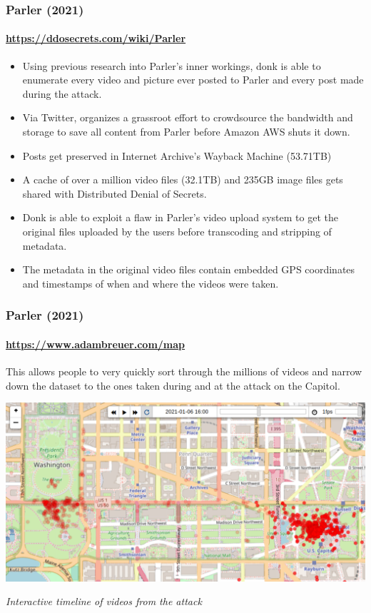 \documentclass[aspectratio=169,usenames,dvipsnames]{beamer}
\begin{document}
\begin{frame}
  \frametitle{Parler (2021)}
  \framesubtitle{\url{https://ddosecrets.com/wiki/Parler}}

  \begin{itemize}[<+->]
    \item Using previous research into Parler's inner workings, donk is
      able to enumerate every video and picture ever posted to Parler and
      every post made during the attack.
    \item Via Twitter, organizes a grassroot effort to crowdsource the
      bandwidth and storage to save all content from Parler before Amazon AWS
      shuts it down.
    \item Posts get preserved in Internet Archive's Wayback Machine (53.71TB)
    \item A cache of over a million video files (32.1TB) and 235GB image files
      gets shared with Distributed Denial of Secrets.
    \item Donk is able to exploit a flaw in Parler's video upload system
      to get the original files uploaded by the users before transcoding and
      stripping of metadata.
    \item The metadata in the original video files contain embedded GPS
      coordinates and timestamps of when and where the videos were taken.
  \end{itemize}

\end{frame}

\begin{frame}[c]
  \frametitle{Parler (2021)}
  \framesubtitle{\url{https://www.adambreuer.com/map}}

  This allows people to very quickly sort through the millions of videos
  and narrow down the dataset to the ones taken during and at the attack
  on the Capitol.

  \vspace{3mm}

  \centering
  \includegraphics[width=\textwidth,height=0.4\textheight,keepaspectratio]{img/parler_map.png}

  \vspace{2mm}
  \footnotesize
  \emph{Interactive timeline of videos from the attack}

\end{frame}
\end{document}
